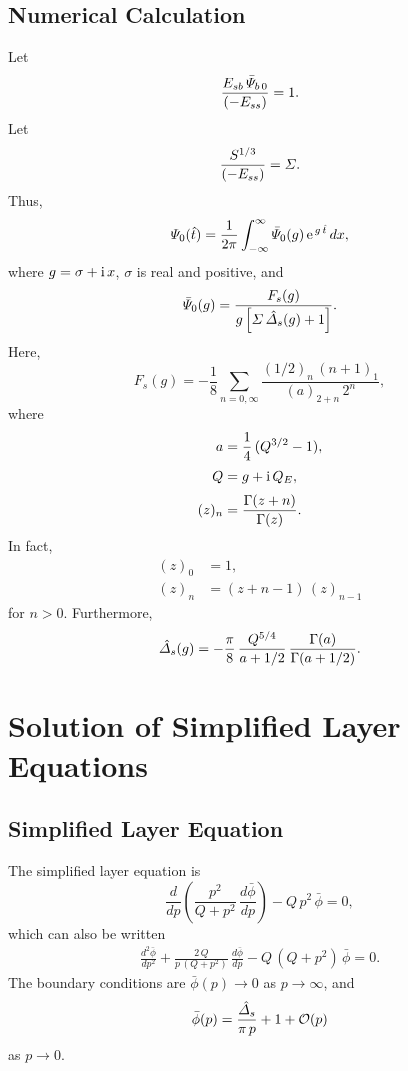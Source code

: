 \documentclass[titlepage=false,12pt]{article}
\begin{document}
\subsection{Numerical Calculation}
Let 
\begin{equation}
\frac{E_{sb}\,\bar{\mit\Psi}_{b\,0}}{(-E_{ss})} = 1.
\end{equation}
Let 
\begin{equation}
\frac{S^{1/3}}{(-E_{ss})} ={\mit\Sigma}.
\end{equation}
Thus,
\begin{equation}
{\mit\Psi}_0(\hat{t}) = \frac{1}{2\pi}\int_{-\infty}^{\infty}
\bar{\mit\Psi}_0(g)\,{\rm e}^{\,g\,\hat{t}}\,dx,
\end{equation}
where $g=\sigma + {\rm i}\,x$,  $\sigma$ is real and positive, and 
\begin{equation}
\bar{\mit\Psi}_0(g)= \frac{F_s(g)}{g\left[{\mit\Sigma}\,\hat{\mit\Delta}_s(g)+ 1\right]}.
\end{equation}
Here,
\begin{equation}
F_s(g) = -\frac{1}{8}\sum_{n=0,\infty}\frac{(1/2)_n\,(n+1)_1}{(a)_{2+n}\,2^n},
\end{equation}
where
\begin{align}
a&= \frac{1}{4}\,(Q^{3/2}-1),\\[0.5ex]
Q &= g+ {\rm i}\,Q_E,\\[0.5ex]
(z)_n &= \frac{\Gamma(z+n)}{\Gamma(z)}.
\end{align}
In fact,
\begin{align}
(z)_0 &=1,\\[0.5ex]
(z)_n &= (z+n-1)\,(z)_{n-1}
\end{align}
for $n>0$. 
Furthermore,
\begin{equation}
\hat{\mit\Delta}_s(g) = -\frac{\pi}{8}\,\frac{Q^{5/4}}{a+1/2}\,\frac{\Gamma(a)}{\Gamma(a+1/2)}.
\end{equation}

\section{Solution of Simplified Layer Equations}
\subsection{Simplified Layer Equation}
The simplified  layer equation is
\begin{equation}\label{layer}
\frac{d}{dp}\!\left(\frac{p^2}{Q+p^2}\,\frac{d\bar{\phi}}{dp}\right)-Q\,p^2\,\bar{\phi}=0,
\end{equation}
which can also be written
\begin{align}\label{layer1}
\frac{d^2\bar{\phi}}{dp^2} +\frac{2\,Q}{p\,(Q+p^2)}\,\frac{d\bar{\phi}}{dp} - Q\,(Q+p^2)\,\bar{\phi}=0.
\end{align}
The boundary conditions are $\bar{\phi}(p)\rightarrow 0$ as $p\rightarrow \infty$, and
\begin{equation}
\bar{\phi}(p) = \frac{\hat{\mit\Delta}_s}{\pi\,p} + 1 + {\cal O}(p)
\end{equation}
as $p\rightarrow 0$. 
\end{document}
